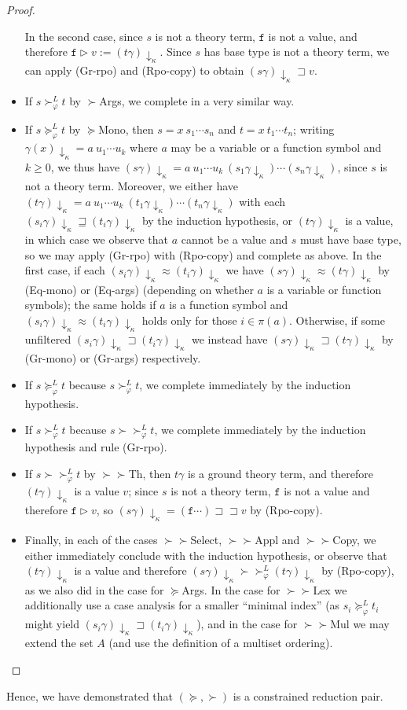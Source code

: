 \documentclass[a4paper,USenglish,cleveref,autoref,thm-restate]{lipics-v2021}
\newcommand{\gtvA}{L}
\newcommand{\downarrowcalc}{\downarrow_\kappa}
\newcommand{\grmain}{\sqsupset}
\newcommand{\geqmain}{\sqsupseteq}
\newcommand{\ismain}{\approx}
\newcommand{\rpomain}{\sqsupset\!\!\sqsupset}
\newcommand{\geqth}{\succeq_\varphi^\gtvA}
\newcommand{\grth}{\succ_\varphi^\gtvA}
\newcommand{\rpoth}{\succ\!\!\!\succ_\varphi^\gtvA}
\newcommand{\rpo}{\succ\!\!\!\succ}
\newcommand{\grpred}{\rhd}
\newcommand{\symb}[1]{\mathtt{#1}}
\newcommand{\afun}{\symb{f}}
\newcommand{\filter}{\pi}
\begin{document}
\begin{proof}
\begin{itemize}
  In the second case, since $s$ is not a theory term, $\afun$ is not a value, and therefore
  $\afun \grpred v := (t\gamma)\downarrowcalc$.  Since $s$ has base type is not a theory term, we
  can apply (Gr-rpo) and (Rpo-copy) to obtain $(s\gamma)\downarrowcalc \grmain v$.
\item If $s \grth t$ by $\succ$Args, we complete in a very similar way.
\item If $s \geqth t$ by $\succeq$Mono, then $s = x\ s_1 \cdots s_n$ and $t = x\ t_1 \cdots t_n$;
  writing $\gamma(x)\downarrowcalc = a\ u_1 \cdots u_k$ where $a$ may be a variable or a function
  symbol and $k \geq 0$, we thus have $(s\gamma)\downarrowcalc = a\ u_1 \cdots u_k\ (s_1\gamma
  \downarrowcalc) \cdots (s_n\gamma\downarrowcalc)$, since $s$ is not a theory term.  Moreover, we
  either have $(t\gamma)\downarrowcalc = a\ u_1 \cdots u_k\ (t_1\gamma\downarrowcalc) \cdots
  (t_n\gamma\downarrowcalc)$ with each $(s_i\gamma)\downarrowcalc \geqmain (t_i\gamma)
  \downarrowcalc$ by the induction hypothesis, or $(t\gamma)\downarrowcalc$ is a value, in which
  case we observe that $a$ cannot be a value and $s$ must have base type, so we may apply
  (Gr-rpo) with (Rpo-copy) and complete as above.
  In the first case, if each $(s_i\gamma)\downarrowcalc \ismain (t_i\gamma)\downarrowcalc$ we have
  $(s\gamma)\downarrowcalc \ismain (t\gamma)\downarrowcalc$ by (Eq-mono) or (Eq-args) (depending
  on whether $a$ is a variable or function symbols); the same holds if $a$ is a function symbol and
  $(s_i\gamma)\downarrowcalc \ismain (t_i\gamma)\downarrowcalc$ holds only for those $i \in
  \filter(a)$.  Otherwise, if some unfiltered $(s_i\gamma)\downarrowcalc \grmain
  (t_i\gamma)\downarrowcalc$ we instead have
  $(s\gamma)\downarrowcalc \grmain (t\gamma)\downarrowcalc$ by (Gr-mono) or (Gr-args) respectively.
\item If $s \geqth t$ because $s \grth t$, we complete immediately by the induction hypothesis.
\item If $s \grth t$ because $s \rpoth t$, we complete immediately by the induction hypothesis and
  rule (Gr-rpo).
\item If $s \rpoth t$ by $\rpo$Th, then $t\gamma$ is a ground theory term, and therefore
  $(t\gamma)\downarrowcalc$ is a value $v$; since $s$ is not a theory term, $\afun$ is not a value
  and therefore $\afun \grpred v$, so $(s\gamma)\downarrowcalc = (\afun \cdots) \rpomain v$ by
  (Rpo-copy).
\item Finally, in each of the cases $\rpo$Select, $\rpo$Appl and $\rpo$Copy, we either
  immediately conclude with the induction hypothesis, or observe that $(t\gamma)\downarrowcalc$
  is a value and therefore $(s\gamma)\downarrowcalc \rpoth (t\gamma)\downarrowcalc$ by (Rpo-copy),
  as we also did in the case for $\succeq$Args.
  In the case for $\rpo$Lex we additionally use a case analysis for a smaller ``minimal index''
  (as $s_i \geqth t_i$ might yield $(s_i\gamma)\downarrowcalc \grmain (t_i\gamma)\downarrowcalc$),
  and in the case for $\rpo$Mul we may extend the set $A$ (and use the definition of a multiset
  ordering).
  \qedhere
\end{itemize}
\end{proof}

Hence, we have demonstrated that $(\succeq,\succ)$ is a constrained reduction pair.


\end{document}
